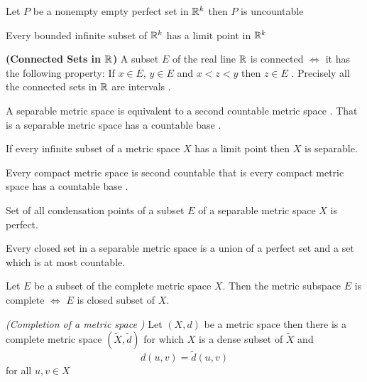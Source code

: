 \begin{theorem} Let $P$ be a nonempty empty perfect set in $\mathbb{R}^k$ then $P$ is uncountable\end{theorem}
\begin{theorem} Every bounded infinite subset of $\mathbb{R}^k$ has a limit point in $\mathbb{R}^k$ \end{theorem}
\begin{theorem} \textbf{(Connected Sets in $\mathbb{R}$)} A subset $E$ of the real line $\mathbb{R}$ is connected $\iff$ it has the following property: If $x\in E$, $y\in E$ and $x<z<y$ then $z\in E$  .  Precisely all the connected sets in  $\mathbb{R}$ are intervals .\end{theorem}
\begin{theorem} A separable metric space is equivalent to a second countable metric space . That is a separable metric space has a countable base .\end{theorem}
\begin{theorem} If every infinite subset of a metric space $X$ has a limit point then $X$ is separable.\end{theorem}
\begin{theorem} Every compact metric space is second countable that is every compact metric space has a countable base .\end{theorem}
\begin{theorem} Set of all condensation points of a subset $E$ of a separable metric space $X$ is perfect.\end{theorem}
\begin{theorem} Every closed set in a separable metric space is a union of a perfect set and a set which is at most countable.\end{theorem}
\begin{theorem} Let $E$ be a subset of the complete metric space $X$. Then the metric subspace $E$ is complete $\iff$ $E$ is closed subset of $X$. \end{theorem}
\begin{theorem}\textit{(Completion of a metric space )} Let $(X,d)$ be a metric space then there is a complete metric space $(\tilde{X},\tilde{d})$ for which $X$ is a dense subset of $\tilde{X}$ and \[d(u,v) = \tilde{d}(u,v)\] for all $u,v\in X$\end{theorem}